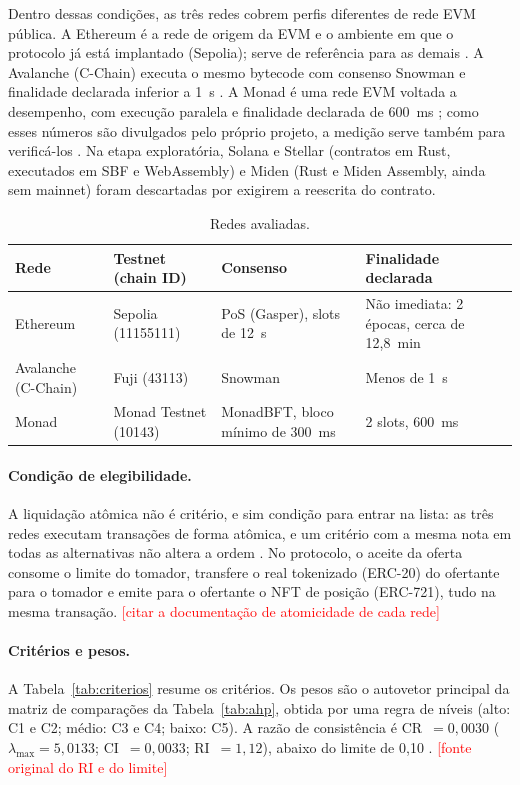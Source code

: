 \documentclass[10pt,a4paper]{article}
\newcommand{\pendente}[1]{\textcolor{red}{[#1]}}
\begin{document}
Dentro dessas condições, as três redes cobrem perfis diferentes de rede EVM pública. A Ethereum é a rede de origem da EVM e o ambiente em que o protocolo já está implantado (Sepolia); serve de referência para as demais \cite{ethereum2024gasper}. A Avalanche (C-Chain) executa o mesmo bytecode com consenso Snowman e finalidade declarada inferior a 1~s \cite{avalanche2024consensus}. A Monad é uma rede EVM voltada a desempenho, com execução paralela e finalidade declarada de 600~ms \cite{monad2024bft}; como esses números são divulgados pelo próprio projeto, a medição serve também para verificá-los \cite{gramoli2023}. Na etapa exploratória, Solana e Stellar (contratos em Rust, executados em SBF e WebAssembly) e Miden (Rust e Miden Assembly, ainda sem mainnet) foram descartadas por exigirem a reescrita do contrato.

\begin{table}[ht]
\centering
\caption{Redes avaliadas.}\label{tab:redes}
\small
\begin{tabularx}{\linewidth}{@{}lllX@{}}
\toprule
Rede & Testnet (chain ID) & Consenso & Finalidade declarada \\
\midrule
Ethereum & Sepolia (11155111) & PoS (Gasper), slots de 12~s & Não imediata: 2 épocas, cerca de 12,8~min \cite{ethereum2024gasper} \\
Avalanche (C-Chain) & Fuji (43113) & Snowman & Menos de 1~s \cite{avalanche2024consensus} \\
Monad & Monad Testnet (10143) & MonadBFT, bloco mínimo de 300~ms & 2 slots, 600~ms \cite{monad2024bft} \\
\bottomrule
\end{tabularx}
\end{table}

\paragraph{Condição de elegibilidade.} A liquidação atômica não é critério, e sim condição para entrar na lista: as três redes executam transações de forma atômica, e um critério com a mesma nota em todas as alternativas não altera a ordem \cite{baninemeh2023}. No protocolo, o aceite da oferta consome o limite do tomador, transfere o real tokenizado (ERC-20) do ofertante para o tomador e emite para o ofertante o NFT de posição (ERC-721), tudo na mesma transação. \pendente{citar a documentação de atomicidade de cada rede}

\paragraph{Critérios e pesos.} A Tabela~\ref{tab:criterios} resume os critérios. Os pesos são o autovetor principal da matriz de comparações da Tabela~\ref{tab:ahp}, obtida por uma regra de níveis (alto: C1 e C2; médio: C3 e C4; baixo: C5). A razão de consistência é CR~$=0{,}0030$ ($\lambda_{\max}=5{,}0133$; CI~$=0{,}0033$; RI~$=1{,}12$), abaixo do limite de 0,10 \cite{saaty2001}. \pendente{fonte original do RI e do limite}
\end{document}
